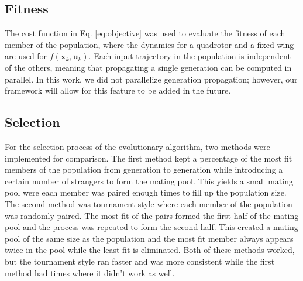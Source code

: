 \documentclass[letterpaper, 10 pt, conference]{ieeeconf}  %
\newcommand{\todo}[1]{{\color{blue}[TODO: #1]}}
\begin{document}
	
	
	
	
	
	
	\subsection{Fitness}
	
	The cost function in Eq. \eqref{eq:objective} was used to evaluate the fitness of each member of the population, where the dynamics for a quadrotor and a fixed-wing are used for $f(\mathbf{x}_k,\mathbf{u}_k)$. Each input trajectory in the population is independent of the others, meaning that propagating a single generation can be computed in parallel. In this work, we did not parallelize generation propagation; however, our framework will allow for this feature to be added in the future.
	
	
	
	\subsection{Selection}
	
	For the selection process of the evolutionary algorithm, two methods were implemented for comparison. The first method kept a percentage of the most fit members of the population from generation to generation while introducing a certain number of strangers to form the mating pool. This yields a small mating pool were each member was paired enough times to fill up the population size. The second method was tournament style where each member of the population was randomly paired. The most fit of the pairs formed the first half of the mating pool and the process was repeated to form the second half. This created a mating pool of the same size as the population and the most fit member always appears twice in the pool while the least fit is eliminated. Both of these methods worked, but the tournament style ran faster and was more consistent while the first method had times where it didn't work as well.
	
\end{document}
